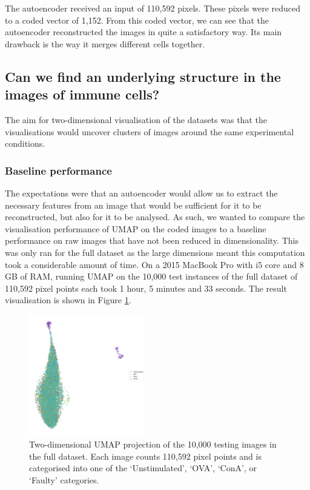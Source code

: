 The autoencoder received an input of 110,592 pixels. These pixels were reduced to a coded vector of 1,152. From this coded vector, we can see that the autoencoder reconstructed the images in quite a satisfactory way. Its main drawback is the way it merges different cells together.

\subsection{Can we find an underlying structure in the images of immune cells?}

The aim for two-dimensional visualisation of the datasets was that the visualisations would uncover clusters of images around the same experimental conditions.

\bigskip
\subsubsection{Baseline performance}
\hfill
\hfill

The expectations were that an autoencoder would allow us to extract the necessary features from an image that would be sufficient for it to be reconstructed, but also for it to be analysed. As such, we wanted to compare the visualisation performance of UMAP on the coded images to a baseline performance on raw images that have not been reduced in dimensionality. This was only ran for the full dataset as the large dimensions meant this computation took a considerable amount of time. On a 2015 MacBook Pro with i5 core and 8 GB of RAM, running UMAP on the 10,000 test instances of the full dataset of 110,592 pixel points each took 1 hour, 5 minutes and 33 seconds. The result visualisation is shown in Figure \ref{fig:baseline_vis}.

\begin{figure}[h!]
    \centering
    \includegraphics[width=0.45\textwidth]{dissertation/figures/CK19_baseline_visualisation.png}
    \caption{Two-dimensional UMAP projection of the 10,000 testing images in the full dataset. Each image counts 110,592 pixel points and is categorised into one of the `Unstimulated', `OVA', `ConA', or `Faulty' categories.}
    \label{fig:baseline_vis}
\end{figure}

